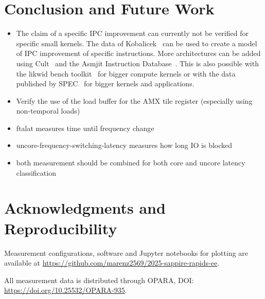 \chapter{Conclusion and Future Work}
\label{sec:summary}

\begin{itemize}
    \item The claim of a specific IPC improvement can currently not be verified for specific small kernels.
    The data of Kobalicek~\cite{Kobalicek_AsmGrid} can be used to create a model of IPC improvement of specific instructions.
    More architectures can be added using Cult~\cite{Kobalicek_Cult} and the Asmjit Instruction Database~\cite{Kobalicek_InstructionDB}.
    This is also possible with the likwid bench toolkit~\cite{RHZE_HPC_likwid} for bigger compute kernels or with the data published by SPEC~\cite{spec} for bigger kernels and applications.
    \item Verify the use of the load buffer for the AMX tile register (especially using non-temporal loads)
    \item ftalat measures time until frequency change
    \item uncore-frequency-switching-latency measures how long IO is blocked
    \item both measurement should be combined for both core and uncore latency classification
\end{itemize}

\chapter*{Acknowledgments and Reproducibility}
Measurement configurations, software and Jupyter notebooks for plotting are available at \url{https://github.com/marenz2569/2025-sappire-rapids-ee}.

All measurement data is distributed through OPARA, DOI: \url{https://doi.org/10.25532/OPARA-935}.
